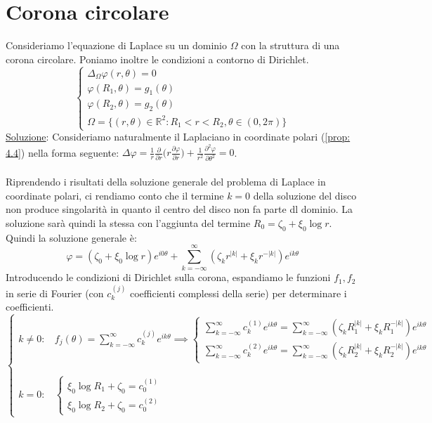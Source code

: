 \documentclass[a4paper,12pt]{report}
\newcommand{\lt}{<}
\newcommand{\pd}[2]{\frac{\partial #1}{\partial #2}}
\newcommand{\pdd}[2]{\frac{\partial^2 #1}{\partial #2^2}}
\begin{document}
\section{Corona circolare}

Consideriamo l'equazione di Laplace su un dominio $\Omega$ con la struttura di una corona circolare. Poniamo inoltre le condizioni a contorno di Dirichlet.
\[\begin{cases}
    \Delta_\Omega\varphi(r,\theta)=0
    \\ \varphi(R_1,\theta)=g_1(\theta)
    \\\varphi(R_2,\theta)=g_2(\theta)
    \\\Omega=\{(r,\theta)\in \mathbb{R}^2: R_1\lt r\lt R_2, \theta\in(0,2\pi)\}
\end{cases}\]
\underline{Soluzione}: Consideriamo naturalmente il Laplaciano in coordinate polari (\ref{prop: 4.4}) nella forma seguente: $\Delta\varphi=\displaystyle\frac{1}{r}\pd{}{r}\bigg(r\pd{\varphi}{r}\bigg)+\frac{1}{r^2}\pdd{\varphi}{\theta}=0$.
\\
\\Riprendendo i risultati della soluzione generale del problema di Laplace in coordinate polari, ci rendiamo conto che il termine $k=0$ della soluzione del disco non produce singolarità in quanto il centro del disco non fa parte dl dominio. La soluzione sarà quindi la stessa con l'aggiunta del termine $R_0=\zeta_0+\xi_0\log r$. Quindi la soluzione generale è:
\[\varphi=(\zeta_0+\xi_0\log r)e^{i0\theta}+\sum_{k=-\infty}^\infty (\zeta_kr^{|k|}+\xi_kr^{-|k|})e^{ik\theta}\]
Introducendo le condizioni di Dirichlet sulla corona, espandiamo le funzioni $f_1, f_2$ in serie di Fourier (con $c_k^{(j)}$ coefficienti complessi della serie) per determinare i coefficienti.
\[\begin{cases}
   k\neq0: \ \ \ \ 
f_j(\theta)=\sum_{k=-\infty}^\infty c_k^{(j)}e^{ik\theta}\implies\begin{cases}
    \sum_{k=-\infty}^\infty c_k^{(1)}e^{ik\theta}=\sum_{k=-\infty}^\infty(\zeta_kR_1^{|k|}+\xi_kR_1^{-|k|})e^{ik\theta}
    \\\sum_{k=-\infty}^\infty c_k^{(2)}e^{ik\theta}=\sum_{k=-\infty}^\infty(\zeta_kR_2^{|k|}+\xi_kR_2^{-|k|})e^{ik\theta}
\end{cases}
\\
\\
\\k=0: \ \ \ \ \begin{cases}
    
\xi_0 \log R_1 + \zeta_0 = c_0^{(1)} \\
\xi_0 \log R_2 + \zeta_0 = c_0^{(2)}

\end{cases}
\end{cases}\]
\end{document}
